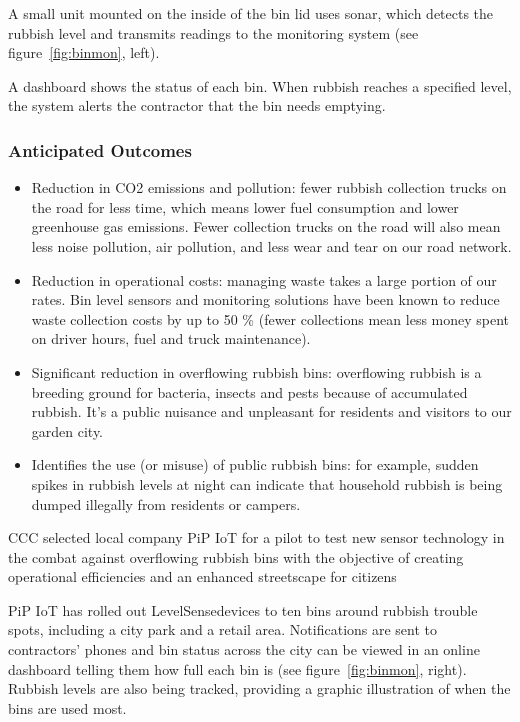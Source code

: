 \documentclass[10pt]{article}
\begin{document}
A small unit mounted on the inside of the bin lid uses sonar, which detects the rubbish level and transmits readings to the monitoring system (see figure~\ref{fig:binmon}, left).

A dashboard shows the status of each bin. When rubbish reaches a specified level, the system alerts the contractor that the bin needs emptying.

\subsubsection{Anticipated Outcomes}

\begin{itemize}
	\item
	Reduction in CO2 emissions and pollution:  fewer rubbish collection trucks on the road for less time, which means lower fuel consumption and lower greenhouse gas emissions. Fewer collection trucks on the road will also mean less noise pollution, air pollution, and less wear and tear on our road network.
	\item
	Reduction in operational costs: managing waste takes a large portion of our rates. Bin level sensors and monitoring solutions have been known to reduce waste collection costs by up to 50 \% (fewer collections mean less money spent on driver hours, fuel and truck maintenance).
	\item
	Significant reduction in overflowing rubbish bins: overflowing rubbish is a breeding ground for bacteria, insects and pests because of accumulated rubbish. It’s a public nuisance and unpleasant for residents and visitors to our garden city.
	\item
	Identifies the use (or misuse) of public rubbish bins: for example, sudden spikes in rubbish levels at night can indicate that household rubbish is being dumped illegally from residents or campers. 
\end{itemize}

CCC selected local company PiP IoT for a pilot to test new sensor technology in the combat against overflowing rubbish bins with the objective of creating operational efficiencies and an enhanced streetscape for citizens

PiP IoT has rolled out LevelSense\texttrademark devices to ten bins around rubbish trouble spots, including a city park and a retail area. Notifications are sent to contractors’ phones and bin status across the city can be viewed in an online dashboard telling them how full each bin is (see figure~\ref{fig:binmon}, right). Rubbish levels are also being tracked, providing a graphic illustration of when the bins are used most.
\end{document}
